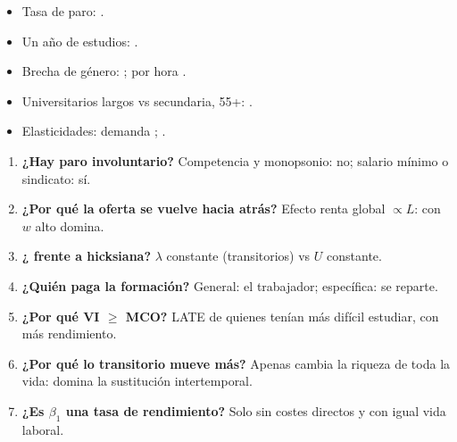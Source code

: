 \documentclass{article}
\begin{document}
\begin{columnas}
\anexorepaso
{}
\begin{itemize}
\item Tasa de paro: .
\item Un año de estudios: .
\item Brecha de género: ; por hora .
\item Universitarios largos vs secundaria, 55+: .
\item Elasticidades: demanda ;  .
\end{itemize}
\begin{enumerate}
\item \textbf{¿Hay paro involuntario?} Competencia y monopsonio: no; salario mínimo o sindicato: sí.
\item \textbf{¿Por qué la oferta se vuelve hacia atrás?} Efecto renta global $\propto L$: con $w$ alto domina.
\item \textbf{¿ frente a hicksiana?} $\lambda$ constante (transitorios) vs $U$ constante.
\item \textbf{¿Quién paga la formación?} General: el trabajador; específica: se reparte.
\item \textbf{¿Por qué VI $\geq$ MCO?} LATE de quienes tenían más difícil estudiar, con más rendimiento.
\item \textbf{¿Por qué lo transitorio mueve más?} Apenas cambia la riqueza de toda la vida: domina la sustitución intertemporal.
\item \textbf{¿Es $\beta_1$ una tasa de rendimiento?} Solo sin costes directos y con igual vida laboral.
\end{enumerate}

\end{columnas}
\end{document}
